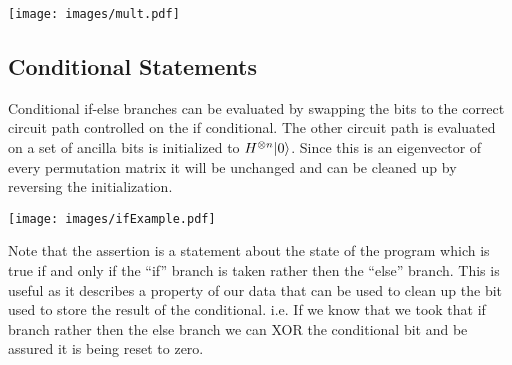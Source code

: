 
\texttt{[image: images/mult.pdf]}

\subsection{Conditional Statements}
Conditional if-else branches can be evaluated by swapping the bits to the correct circuit path controlled on the if conditional.
The other circuit path is evaluated on a set of ancilla bits is initialized to $H^{\otimes n}{\left\vert{0}\right\rangle}$.
Since this is an eigenvector of every permutation matrix it will be unchanged and can be cleaned up by reversing the initialization.


\texttt{[image: images/ifExample.pdf]}

Note that the assertion is a statement about the state of the program which is true if and only if the ``if'' branch is taken rather then the ``else'' branch.
This is useful as it describes a property of our data that can be used to clean up the bit used to store the result of the conditional.
i.e. If we know that we took that if branch rather then the else branch we can XOR the conditional bit and be assured it is being reset to zero.


